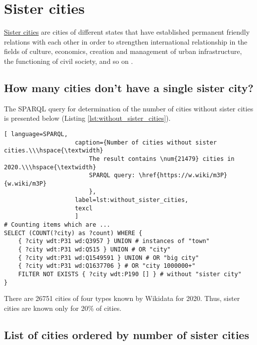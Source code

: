 \section{Sister cities}

\href{https://en.wikipedia.org/wiki/Sister_city}{Sister cities} are cities of different states that have established permanent friendly relations with each other in order to strengthen international relationship in the fields of culture, economics, creation and management of urban infrastructure, the functioning of civil society, and so on .

\subsection{How many cities don't have a single sister city?}

The SPARQL query for determination of the number of cities without sister cities is presented below (Listing \ref{lst:without_sister_cities}).

\begin{lstlisting}[ language=SPARQL, 
                    caption={Number of cities without sister cities.\\\hspace{\textwidth}
                        The result contains \num{21479} cities in 2020.\\\hspace{\textwidth}
                        SPARQL query: \href{https://w.wiki/m3P}{w.wiki/m3P}
                        },
                    label=lst:without_sister_cities,
                    texcl 
                    ]
# Counting items which are ... 
SELECT (COUNT(?city) as ?count) WHERE {                             
	{ ?city wdt:P31 wd:Q3957 } UNION # instances of "town"          
	{ ?city wdt:P31 wd:Q515 } UNION # OR "city"                 
	{ ?city wdt:P31 wd:Q1549591 } UNION # OR "big city"                       
	{ ?city wdt:P31 wd:Q1637706 } # OR "city 1000000+"              
	FILTER NOT EXISTS { ?city wdt:P190 [] } # without "sister city"
}
\end{lstlisting}%

There are \num{26751} cities of four types known by Wikidata for 2020. Thus, sister cities are known only for 20\% of cities.

\subsection{List of cities ordered by number of sister cities}

